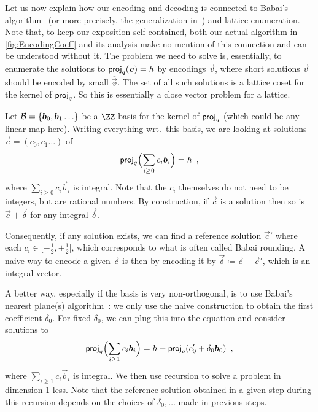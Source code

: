 \begin{remark}\label{rmk:RelationshipToBabai}
Let us now explain how our encoding and decoding is connected to Babai's algorithm~\cite{DBLP:journals/combinatorica/Babai86} (or more precisely, the generalization in~\cite{RSA:LinPei11}) and lattice enumeration.
Note that, to keep our exposition self-contained, both our actual algorithm in \autoref{fig:EncodingCoeff} and its analysis make no mention of this connection and can be understood without it.
The problem we need to solve is, essentially, to enumerate the solutions to $\mathsf{proj}_q(\boldsymbol{v}) = h$ by encodings $\overline{\vec{v}}$, where short solutions $\vec{v}$ should be encoded by small $\overline{\vec{v}}$.
The set of all such solutions is a lattice coset for the kernel of $\mathsf{proj}_q$. So this is essentially a close vector problem for a lattice.

Let $\mathcal{B} = \{\boldsymbol{b}_0,\boldsymbol{b}_1\ldots\}$ be a $\ZZ$-basis for the kernel of $\mathsf{proj}_q$ (which could be any linear map here).
Writing everything wrt.\ this basis, we are looking at solutions $\vec{c} = (c_0,c_1\ldots)$ of
\[
\mathsf{proj}_q\Bigl(\sum_{i\geq 0} c_i\boldsymbol{b}_i\Bigr) = h\enspace,
\]
where $\sum_{i\geq 0} c_i\vec{b}_i$ is integral.
Note that the $c_i$ themselves do not need to be integers, but are rational numbers.
By construction, if $\vec{c}$ is a solution then so is $\vec{c} + \vec{\delta}$ for any integral $\vec{\delta}$.

Consequently, if any solution exists, we can find a reference solution $\vec{c}'$ where each $c_i\in [-\tfrac12,+\tfrac12[$, which corresponds to what is often called Babai rounding.
A naive way to encode a given $\vec{c}$ is then by encoding it by $\vec{\delta} \coloneqq \vec{c} - \vec{c}'$, which is an integral vector.

A better way, especially if the basis is very non-orthogonal, is to use Babai's nearest plane(s) algorithm~\cite{DBLP:journals/combinatorica/Babai86,RSA:LinPei11}:
we only use the naive construction to obtain the first coefficient $\delta_0$. For fixed $\delta_0$, we can plug this into the equation and consider solutions to
\[
\mathsf{proj}_q\Bigl(\sum_{i\geq 1} c_i\boldsymbol{b}_i\Bigr) = h - \mathsf{proj}_q(c'_0 + \delta_0\boldsymbol{b}_0)\enspace,
\]
where $\sum_{i\geq 1} c_i\vec{b}_i$ is integral. We then use recursion to solve a problem in dimension 1 less.
Note that the reference solution obtained in a given step during this recursion depends on the choices of $\delta_0,\ldots$ made in previous steps.


\end{remark}
